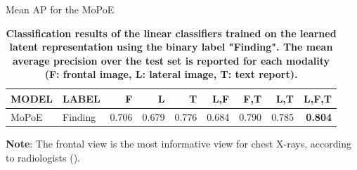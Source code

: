     \begin{frame}{Mean AP for the MoPoE}
        \begin{table}
            \centering
            \begin{tabular}{llrrrrrrr}
                MODEL & LABEL   & F     & L     & T     & L,F   & F,T   & L,T   & L,F,T          \\
                \midrule
                MoPoE & Finding & 0.706 & 0.679 & 0.776 & 0.684 & 0.790 & 0.785 & \textbf{0.804} \\

            \end{tabular}
            \caption{\textbf{Classification results of the linear classifiers trained on the learned latent representation using the binary label "Finding". The mean average precision over the test set
            is reported for each modality (F: frontal image, L: lateral image, T: text report).}}
        \end{table}
        \pause
        \small{\textbf{Note}: The frontal view is the most informative view for chest X-rays, according to radiologists (\cite{kovaleva2020towards}).}
    \end{frame}


